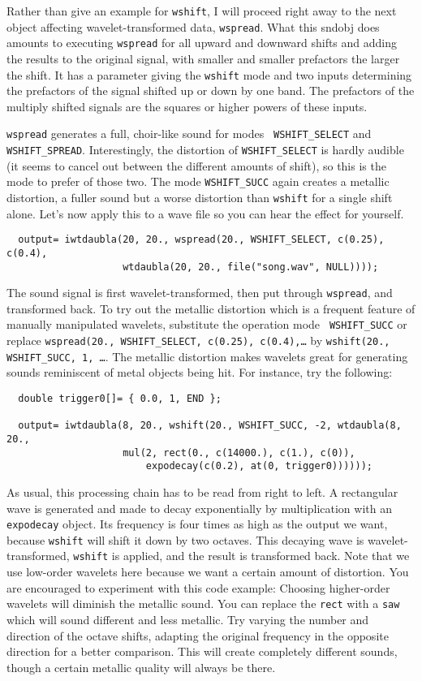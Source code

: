\documentclass{article}
\def\bv{\begin{verbatim}}
\begin{document}
Rather than give an example for {\tt wshift}, I will proceed right away to the
next object affecting wavelet-transformed data, {\tt wspread}.  What this
sndobj does amounts to executing {\tt wspread} for all upward and downward
shifts and adding the results to the original signal, with smaller and smaller
prefactors the larger the shift.  It has a parameter giving the {\tt wshift}
mode and two inputs determining the prefactors of the signal shifted up or down
by one band.  The prefactors of the multiply shifted signals are the squares or
higher powers of these inputs.

{\tt wspread} generates a full, choir-like sound for modes {\tt
WSHIFT\_SELECT} and {\tt WSHIFT\_SPREAD}.  Interestingly, the distortion of
{\tt WSHIFT\_SELECT} is hardly audible (it seems to cancel out between the
different amounts of shift), so this is the mode to prefer of those two.  The
mode {\tt WSHIFT\_SUCC} again creates a metallic distortion, a fuller sound
but a worse distortion than {\tt wshift} for a single shift alone.  Let's
now apply this to a wave file so you can hear the effect for yourself.

\bv
  output= iwtdaubla(20, 20., wspread(20., WSHIFT_SELECT, c(0.25), c(0.4),
                    wtdaubla(20, 20., file("song.wav", NULL))));
\end{verbatim}

The sound signal is first wavelet-transformed, then put through {\tt wspread},
and transformed back.  To try out the metallic distortion which is a frequent
feature of manually manipulated wavelets, substitute the operation mode {\tt
WSHIFT\_SUCC} or replace {\tt wspread(20., WSHIFT\_SELECT, c(0.25),
c(0.4),\ldots} by {\tt wshift(20., WSHIFT\_SUCC, 1, \ldots}.  The metallic
distortion makes wavelets great for generating sounds reminiscent of metal
objects being hit.  For instance, try the following:

\bv
  double trigger0[]= { 0.0, 1, END };

  output= iwtdaubla(8, 20., wshift(20., WSHIFT_SUCC, -2, wtdaubla(8, 20.,
                    mul(2, rect(0., c(14000.), c(1.), c(0)), 
                        expodecay(c(0.2), at(0, trigger0))))));
\end{verbatim}

As usual, this processing chain has to be read from right to left.  A
rectangular wave is generated and made to decay exponentially by multiplication
with an {\tt expodecay} object.  Its frequency is four times as high as the
output we want, because {\tt wshift} will shift it down by two octaves.  This
decaying wave is wavelet-transformed, {\tt wshift} is applied, and the result
is transformed back.  Note that we use low-order wavelets here because we want
a certain amount of distortion.  You are encouraged to experiment with this
code example: Choosing higher-order wavelets will diminish the metallic sound.
You can replace the {\tt rect} with a {\tt saw} which will sound different and
less metallic.  Try varying the number and direction of the octave shifts,
adapting the original frequency in the opposite direction for a better
comparison.  This will create completely different sounds, though a certain
metallic quality will always be there.
\end{document}
